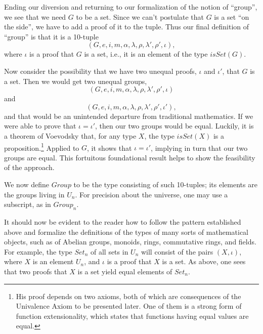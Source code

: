 \documentclass[letter,12pt]{amsart}
\theoremstyle{definition}
\theoremstyle{remark}
\numberwithin{equation}{section}
\begin{document}
Ending our diversion and returning to our formalization of the notion of ``group'', we see that we need $G$ to be a set.  Since we can't
postulate that $G$ is a set ``on the side'', we have to add a proof of it to the tuple.  Thus our final definition of ``group'' is that it is a
10-tuple $$(G,e,i,m,\alpha,\lambda,\rho,\lambda',\rho',\iota),$$ where $\iota$ is a proof that $G$ is a set, i.e., it is an element of the type
$isSet(G)$.

Now consider the possibility that we have two unequal proofs, $\iota$ and $\iota'$, that $G$ is a set.  Then we would get two unequal groups,
$$(G,e,i,m,\alpha,\lambda,\rho,\lambda',\rho',\iota)$$ and $$(G,e,i,m,\alpha,\lambda,\rho,\lambda',\rho',\iota'),$$ and that would be an
unintended departure from traditional mathematics.  If we were able to prove that $\iota = \iota'$, then our two groups would be equal.
Luckily, it is a theorem of Voevodsky that, for any type $X$, the type $isSet(X)$ is a proposition.\footnote{His proof depends on two axioms,
  both of which are consequences of the Univalence Axiom to be presented later.  One of them is a strong form of function extensionality, which
  states that functions having equal values are equal.}  Applied to $G$,
it shows that $\iota = \iota'$, implying in turn that our two groups are equal.  This fortuitous foundational result helps to show the feasibility of
the approach.

We now define $Group$ to be the type consisting of such 10-tuples; its elements are the groups living in $U_n$.  For precision about the
universe, one may use a subscript, as in $Group_n$.

It should now be evident to the reader how to follow the pattern established above and formalize the definitions of the types of many sorts of
mathematical objects, such as of Abelian groups, monoids, rings, commutative rings, and fields.  For example, the type $Set_n$ of all sets in
$U_n$ will consist of the pairs $(X,\iota)$, where $X$ is an element $U_n$, and $\iota$ is a proof that $X$ is a set.  As above, one sees that
two proofs that $X$ is a set yield equal elements of $Set_n$.
\end{document}
